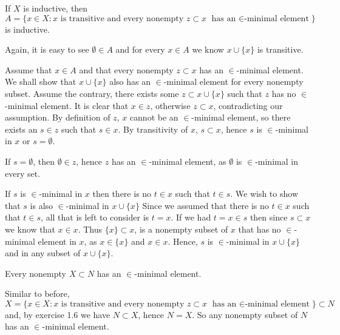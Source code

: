 \begin{problem}
  If $X$ is inductive, then $A = \{x \in X : x \text{ is transitive and every nonempty } z \subset x \text{ has an $\in$-minimal element}\}$ is inductive.
\end{problem}

\begin{solution}
  Again, it is easy to see $\emptyset \in A$ and for every $x \in A$ we know $x \cup \{x\}$ is transitive.

  Assume that $x \in A$ and that every nonempty $z \subset x$ has an $\in$-minimal element.
  We shall show that $x \cup \{x\}$ also has an $\in$-minimal element for every nonempty subset.
  Assume the contrary, there exists some $z \subset x \cup \{x\}$ such that $z$ has no $\in$-minimal element.
  It is clear that $x \in z$, otherwise $z \subset x$, contradicting our assumption.
  By definition of $z$, $x$ cannot be an $\in$-minimal element, so there exists an $s \in z$ such that $s \in x$.
  By transitivity of $x$, $s \subset x$, hence $s$ is $\in$-minimal in $x$ or $s = \emptyset$.

  If $s = \emptyset$, then $\emptyset \in z$, hence $z$ has an $\in$-minimal element, as $\emptyset$ is $\in$-minimal in every set.

  If $s$ is $\in$-minimal in $x$ then there is no $t \in x$ such that $t \in s$.
  We wish to show that $s$ is also $\in$-minimal in $x \cup \{x\}$
  Since we assumed that there is no $t \in x$ such that $t \in s$, all that is left to consider is $t = x$.
  If we had $t = x \in s$ then since $s \subset x$ we know that $x \in x$.
  Thus $\{x\} \subset x$, is a nonempty subset of $x$ that has no $\in$-minimal element in $x$, as $x \in \{x\}$ and $x \in x$.
  Hence, $s$ is $\in$-minimal in $x \cup \{x\}$ and in any subset of $x \cup \{x\}$.
\end{solution}

\begin{problem}
  Every nonempty $X \subset N$ has an $\in$-minimal element.
\end{problem}

\begin{solution}
  Similar to before, $X = \{x \in X : x \text{ is transitive and every nonempty } z \subset x \text{ has an $\in$-minimal element}\} \subset N$ and, by exercise 1.6 we have $N \subset X$, hence $N = X$.
  So any nonempty subset of $N$ has an $\in$-minimal element.
\end{solution}

